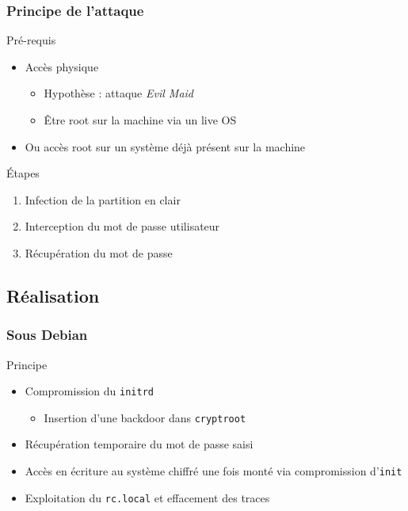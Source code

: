 \documentclass[red]{beamer}
\begin{document}
\begin{frame}
    \frametitle{Principe de l'attaque}
    \begin{block}{Pré-requis}
        \begin{itemize}
            \item Accès physique
            \begin{itemize}
                \item Hypothèse : attaque \textit{Evil Maid}
                \item Être root sur la machine via un live OS
            \end{itemize}
        \item Ou accès root sur un système déjà présent sur la 
        machine
        \end{itemize}
    \end{block}
    \pause
    
    \begin{block}{\'Etapes}
        \begin{enumerate}
            \item Infection de la partition en clair
            \item Interception du mot de passe utilisateur
            \item Récupération du mot de passe
        \end{enumerate}
    \end{block}
\end{frame}

\subsection{Réalisation}
\begin{frame}
    \frametitle{Sous Debian}
    \begin{block}{Principe}
        \begin{itemize}
            \item Compromission du \texttt{initrd}
            \begin{itemize}
                \item Insertion d'une backdoor dans \texttt{cryptroot}
            \end{itemize}
            \item Récupération temporaire du mot de passe saisi
            \item Accès en écriture au système chiffré une fois monté
            via compromission d'\texttt{init}
            \item Exploitation du \texttt{rc.local} et effacement des
            traces
        \end{itemize}
    \end{block}
\end{frame}
\end{document}
